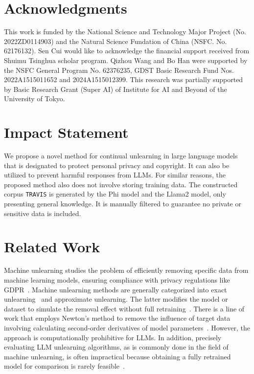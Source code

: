 \documentclass{article}
\theoremstyle{plain}
\theoremstyle{definition}
\theoremstyle{remark}
\begin{document}
\section*{Acknowledgments}
This work is funded by the National Science and Technology Major Project (No. 2022ZD0114903) and the Natural Science Fundation of China (NSFC. No. 62176132). Sen Cui would like to acknowledge the financial support received from Shuimu Tsinghua scholar program. Qizhou Wang and Bo Han were supported by the NSFC General Program No. 62376235, GDST Basic Research Fund Nos. 2022A1515011652 and 2024A1515012399.
This research was partially supported by Basic Research Grant (Super AI) of Institute for AI and Beyond of the University of Tokyo.

\section*{Impact Statement}
We propose a novel method for continual unlearning in large language models that is designated to protect personal privacy and copyright.
It can also be utilized to prevent harmful responses from LLMs.
For similar reasons, the proposed method also does not involve storing training data.
The constructed corpus \texttt{TRAVIS} is generated by the Phi model and the Llama2 model, only presenting general knowledge.
It is manually filtered to guarantee no private or sensitive data is included.





\nocite{langley00}





\newpage
\appendix
\onecolumn




\section{Related Work}
Machine unlearning studies the problem of efficiently removing specific data from machine learning models, ensuring compliance with privacy regulations like GDPR~\cite{DBLP:conf/sp/CaoY15, wang2025gru, DBLP:journals/sncs/ZhangNIS23, DBLP:conf/nips/NiuPSMS16, DBLP:journals/corr/abs-2410-03124}.
Machine unlearning methods are generally categorized into exact unlearning~\cite{DBLP:conf/colt/UllahM0RA21,DBLP:conf/icml/BrophyL21} and approximate unlearning. The latter modifies the model or dataset to simulate the removal effect without full retraining~\cite{DBLP:conf/icml/WuDD20, DBLP:conf/eccv/GolatkarAS20, DBLP:conf/cvpr/GolatkarARPS21, DBLP:conf/aaai/GravesNG21}.
There is a line of work that employs Newton's method to remove the influence of target data involving calculating second-order derivatives of model parameters~\cite{koh2017understanding, guo2019certified, DBLP:conf/aistats/IzzoSCZ21}.
However, the approach is computationally prohibitive for LLMs.
In addition, precisely evaluating LLM unlearning algorithms, as is commonly done in the field of machine unlearning, is often impractical because obtaining a fully retrained model for comparison is rarely feasible~\cite{DBLP:journals/corr/abs-2410-03523}.
\end{document}
